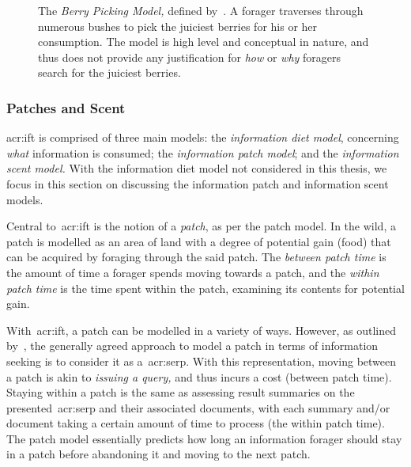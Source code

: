 \begin{figure}[t!]
    \centering
    \caption[The Berry Picking Model~\cite{bates1989berry_picking}]{The \emph{Berry Picking Model,} defined by~\cite{bates1989berry_picking}. A forager traverses through numerous bushes to pick the juiciest berries for his or her consumption. The model is high level and conceptual in nature, and thus does not provide any justification for \emph{how} or \emph{why} foragers search for the juiciest berries.}
    \label{fig:berry_picking}
\end{figure}

\subsubsection{Patches and Scent}\label{sec:stopping_background:theoretical:ift:patch}
\gls{acr:ift} is comprised of three main models: the \emph{information diet model}, concerning \emph{what} information is consumed; the \emph{information patch model}; and the \emph{information scent model.} With the information diet model not considered in this thesis, we focus in this section on discussing the information patch and information scent models.

Central to~\gls{acr:ift} is the notion of a \emph{patch}, as per the patch model. In the wild, a patch is modelled as an area of land with a degree of potential gain (food) that can be acquired by foraging through the said patch. The \emph{between patch time} is the amount of time a forager spends moving towards a patch, and the \emph{within patch time} is the time spent within the patch, examining its contents for potential gain.

With~\gls{acr:ift}, a patch can be modelled in a variety of ways. However, as outlined by~\cite{azzopardi2015theories}, the generally agreed approach to model a patch in terms of information seeking is to consider it as a~\gls{acr:serp}. With this representation, moving between a patch is akin to \emph{issuing a query,} and thus incurs a cost (between patch time). Staying within a patch is the same as assessing result summaries on the presented~\gls{acr:serp} and their associated documents, with each summary and/or document taking a certain amount of time to process (the within patch time). The patch model essentially predicts how long an information forager should stay in a patch before abandoning it and moving to the next patch.

